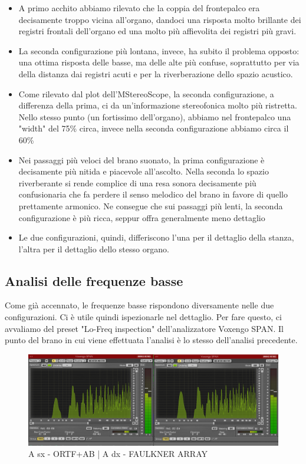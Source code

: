 \documentclass{article}
\begin{document}
    \begin{itemize}
        \item A primo acchito abbiamo rilevato che la coppia del frontepalco era decisamente troppo vicina all'organo, dandoci una risposta molto brillante dei registri frontali dell'organo ed una molto più affievolita dei registri più gravi.
        \item La seconda configurazione più lontana, invece, ha subito il problema opposto: una ottima risposta delle basse, ma delle alte più confuse, soprattutto per via della distanza dai registri acuti e per la riverberazione dello spazio acustico.
        \item Come rilevato dal plot dell'MStereoScope, la seconda configurazione, a differenza della prima, ci da un'informazione stereofonica molto più ristretta. Nello stesso punto (un fortissimo dell'organo), abbiamo nel frontepalco una "width" del 75\% circa, invece nella seconda configurazione abbiamo circa il 60\%
        \item Nei passaggi più veloci del brano suonato, la prima configurazione è decisamente più nitida e piacevole all'ascolto. Nella seconda lo spazio riverberante si rende complice di una resa sonora decisamente più confusionaria che fa perdere il senso melodico del brano in favore di quello prettamente armonico. Ne consegue che sui passaggi più lenti, la seconda configurazione è più ricca, seppur offra generalmente meno dettaglio
        \item Le due configurazioni, quindi, differiscono l'una per il dettaglio della stanza, l'altra per il dettaglio dello stesso organo.
    \end{itemize}
\endsubsection
    
\subsection{Analisi delle frequenze basse}
    Come già accennato, le frequenze basse rispondono diversamente nelle due configurazioni. Ci è utile quindi ispezionarle nel dettaglio. Per fare questo, ci avvaliamo del preset "Lo-Freq inspection" dell'analizzatore Voxengo SPAN. Il punto del brano in cui viene effettuata l'analisi è lo stesso dell'analisi precedente.
    
    \begin{figure}[H]
        \centering
        \includegraphics[width=1\textwidth]{images/2PLOT-SPAN.png}
         \caption{\label{fig11}A sx - ORTF+AB | A dx - FAULKNER ARRAY}
    \end{figure}
    
\end{document}
